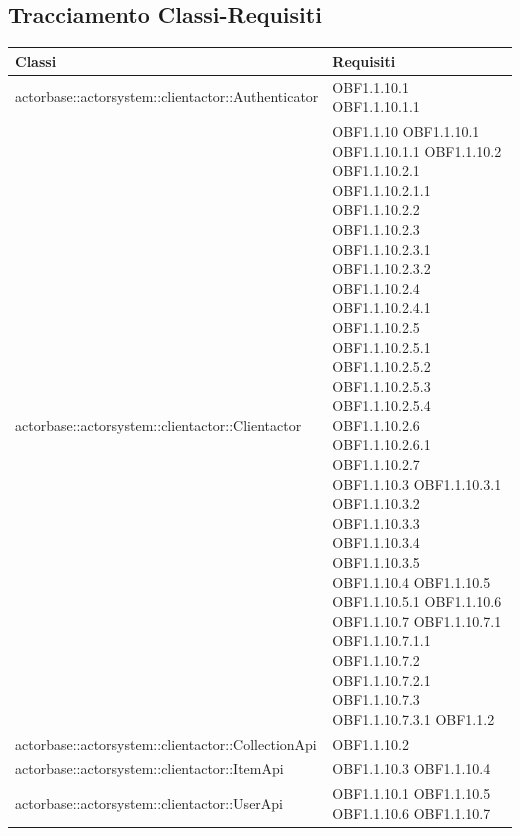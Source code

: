\documentclass{scalatekids-article}
\begin{document}
\subsection{Tracciamento Classi-Requisiti}
\begin{longtable}[H]{|p{12cm}|p{5.5cm}|}
\hline
\textbf{Classi} & \textbf{Requisiti}\\
\hline
actorbase::actorsystem::clientactor::Authenticator & \multiLineCell[t]{OBF1.1.10.1\\OBF1.1.10.1.1\\}\\
\hline
actorbase::actorsystem::clientactor::Clientactor & \multiLineCell[t]{OBF1.1.10 OBF1.1.10.1\\OBF1.1.10.1.1 OBF1.1.10.2\\OBF1.1.10.2.1 OBF1.1.10.2.1.1\\OBF1.1.10.2.2 OBF1.1.10.2.3\\OBF1.1.10.2.3.1 OBF1.1.10.2.3.2\\OBF1.1.10.2.4 OBF1.1.10.2.4.1\\OBF1.1.10.2.5 OBF1.1.10.2.5.1\\OBF1.1.10.2.5.2 OBF1.1.10.2.5.3\\OBF1.1.10.2.5.4 OBF1.1.10.2.6\\OBF1.1.10.2.6.1 OBF1.1.10.2.7\\OBF1.1.10.3 OBF1.1.10.3.1\\OBF1.1.10.3.2 OBF1.1.10.3.3\\OBF1.1.10.3.4 OBF1.1.10.3.5\\OBF1.1.10.4 OBF1.1.10.5\\OBF1.1.10.5.1 OBF1.1.10.6\\OBF1.1.10.7 OBF1.1.10.7.1\\OBF1.1.10.7.1.1 OBF1.1.10.7.2\\OBF1.1.10.7.2.1 OBF1.1.10.7.3\\OBF1.1.10.7.3.1 OBF1.1.2\\}\\
\hline
actorbase::actorsystem::clientactor::CollectionApi & \multiLineCell[t]{OBF1.1.10.2\\}\\
\hline
actorbase::actorsystem::clientactor::ItemApi & \multiLineCell[t]{OBF1.1.10.3 OBF1.1.10.4\\}\\
\hline
actorbase::actorsystem::clientactor::UserApi & \multiLineCell[t]{OBF1.1.10.1 OBF1.1.10.5\\OBF1.1.10.6 OBF1.1.10.7\\}\\

\end{longtable}
\end{document}
